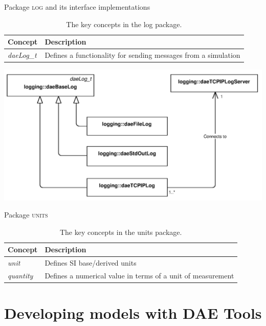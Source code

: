\documentclass[compress,newPxFont,sthlmFooter]{beamer}
\begin{document}
\begin{frame}{Package \textsc{log} and its interface implementations}
\scriptsize
{
\begin{table}
  \caption{The key concepts in the \alert{log} package.}
  \begin{tabularx}{\linewidth}{l>{\raggedright}X}
    \toprule
    \textcolor{sthlmRed}{\textbf{Concept}} & \textcolor{sthlmRed}{\textbf{Description}} \tabularnewline
    \midrule
    \textcolor{sthlmRed}{\textit{daeLog\_t}} & Defines a functionality for sending messages from a simulation \tabularnewline 
    \bottomrule
  \end{tabularx}
\end{table}
}
    \begin{center}
        \includegraphics[width=0.6\paperwidth]{Supplemental_Figure_S7.png}      
    \end{center}
\end{frame}

\begin{frame}{Package \textsc{units}}
\scriptsize
{
\begin{table}
  \caption{The key concepts in the \alert{units} package.}
  \begin{tabularx}{\linewidth}{l>{\raggedright}X}
    \toprule
    \textcolor{sthlmRed}{\textbf{Concept}} & \textcolor{sthlmRed}{\textbf{Description}} \tabularnewline
    \midrule
    \textcolor{sthlmRed}{\textit{unit}} & Defines SI base/derived units \tabularnewline 
    \textcolor{sthlmRed}{\textit{quantity}} & Defines a numerical value in terms of a unit of measurement \tabularnewline
    \bottomrule
  \end{tabularx}
\end{table}
}
\end{frame}

\section{Developing models with DAE Tools} 
\end{document}
